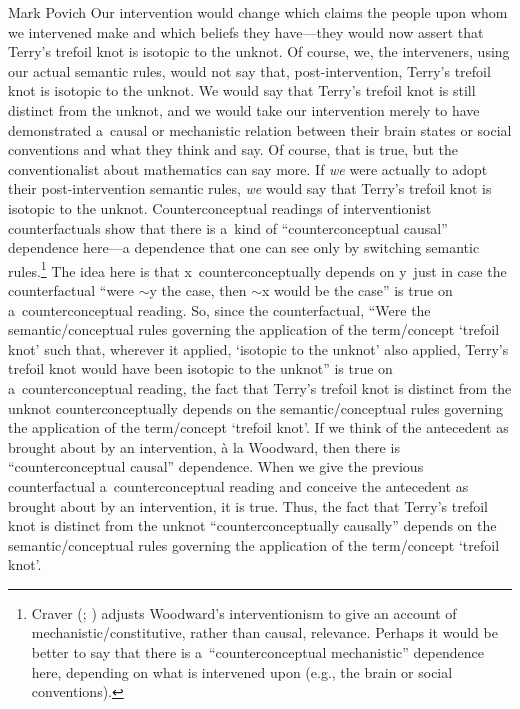 \begin{artengenv}{Mark Povich}
Our intervention would change which claims the people upon whom we intervened make and which beliefs they have---they would now assert that Terry's trefoil knot is isotopic to the unknot. Of course, we, the interveners, using our actual semantic rules, would not say that, post-intervention, Terry's trefoil knot is isotopic to the unknot. We would say that Terry's trefoil knot is still distinct from the unknot, and we would take our intervention merely to have demonstrated a~causal or mechanistic relation between their brain states or social conventions and what they think and say. Of course, that is true, but the conventionalist about mathematics can say more. If \textit{we} were actually to adopt their post-intervention semantic rules, \textit{we} would say that Terry's trefoil knot is isotopic to the unknot. Counterconceptual readings of interventionist counterfactuals show that there is a~kind of ``counterconceptual causal'' dependence here---a dependence that one can see only by switching semantic rules.\footnote{Craver
(\cite*[][]{Craver2007}; \cite[][]{craver_constitutive_2021}) %
 adjusts Woodward's interventionism to give an account of mechanistic/constitutive, rather than causal, relevance. Perhaps it would be better to say that there is a~``counterconceptual mechanistic'' dependence here, depending on what is intervened upon (e.g., the brain or social conventions).} The idea here is that x~counterconceptually depends on y~just in case the counterfactual ``were ${\sim}$y the case, then ${\sim}$x would be the case'' is true on a~counterconceptual reading. So, since the counterfactual, ``Were the semantic/conceptual rules governing the application of the term/concept ‘trefoil knot' such that, wherever it applied, ‘isotopic to the unknot' also applied, Terry's trefoil knot would have been isotopic to the unknot'' is true on a~counterconceptual reading, the fact that Terry's trefoil knot is distinct from the unknot counterconceptually depends on the semantic/conceptual rules governing the application of the term/concept ‘trefoil knot'. If we think of the antecedent as brought about by an intervention, à la Woodward, then there is ``counterconceptual causal'' dependence. When we give the previous counterfactual a~counterconceptual reading and conceive the antecedent as brought about by an intervention, it is true. Thus, the fact that Terry's trefoil knot is distinct from the unknot ``counterconceptually causally'' depends on the semantic/conceptual rules governing the application of the term/concept ‘trefoil knot'.


\end{artengenv}
